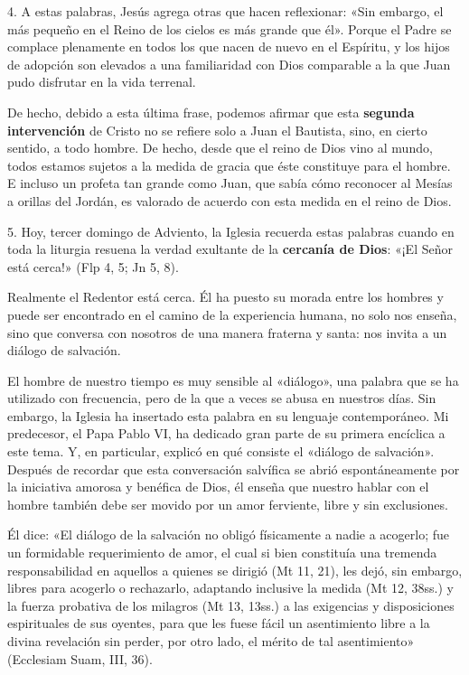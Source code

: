 \documentclass[]{article}
\begin{document}
4. A estas palabras, Jesús agrega otras que hacen reflexionar: «Sin
embargo, el más pequeño en el Reino de los cielos es más grande que él».
Porque el Padre se complace plenamente en todos los que nacen de nuevo
en el Espíritu, y los hijos de adopción son elevados a una familiaridad
con Dios comparable a la que Juan pudo disfrutar en la vida terrenal.

De hecho, debido a esta última frase, podemos afirmar que esta
\textbf{segunda intervención} de Cristo no se refiere solo a Juan el
Bautista, sino, en cierto sentido, a todo hombre. De hecho, desde que el
reino de Dios vino al mundo, todos estamos sujetos a la medida de gracia
que éste constituye para el hombre. E incluso un profeta tan grande como
Juan, que sabía cómo reconocer al Mesías a orillas del Jordán, es
valorado de acuerdo con esta medida en el reino de Dios.

5. Hoy, tercer domingo de Adviento, la Iglesia recuerda estas palabras
cuando en toda la liturgia resuena la verdad exultante de la
\textbf{cercanía de Dios}: «¡El Señor está cerca!» (Flp 4, 5; Jn 5, 8).

Realmente el Redentor está cerca. Él ha puesto su morada entre los
hombres y puede ser encontrado en el camino de la experiencia humana, no
solo nos enseña, sino que conversa con nosotros de una manera fraterna y
santa: nos invita a un diálogo de salvación.

El hombre de nuestro tiempo es muy sensible al «diálogo», una palabra
que se ha utilizado con frecuencia, pero de la que a veces se abusa en
nuestros días. Sin embargo, la Iglesia ha insertado esta palabra en su
lenguaje contemporáneo. Mi predecesor, el Papa Pablo VI, ha dedicado
gran parte de su primera encíclica a este tema. Y, en particular,
explicó en qué consiste el «diálogo de salvación». Después de recordar
que esta conversación salvífica se abrió espontáneamente por la
iniciativa amorosa y benéfica de Dios, él enseña que nuestro hablar con
el hombre también debe ser movido por un amor ferviente, libre y sin
exclusiones.

Él dice: «El diálogo de la salvación no obligó físicamente a nadie a
acogerlo; fue un formidable requerimiento de amor, el cual si bien
constituía una tremenda responsabilidad en aquellos a quienes se dirigió
(Mt 11, 21), les dejó, sin embargo, libres para acogerlo o rechazarlo,
adaptando inclusive la medida (Mt 12, 38ss.) y la fuerza probativa de
los milagros (Mt 13, 13ss.) a las exigencias y disposiciones
espirituales de sus oyentes, para que les fuese fácil un asentimiento
libre a la divina revelación sin perder, por otro lado, el mérito de tal
asentimiento» (Ecclesiam Suam, III, 36).
\end{document}
